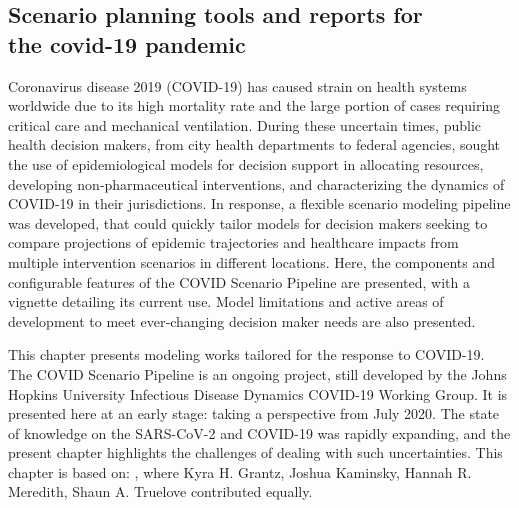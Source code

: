 \begin{fullwidth}
\chapter[Scenario planning tools and reports for the covid-19 pandemic]{Scenario planning tools and reports for \\the covid-19 pandemic}
\label{sec:covid-pipeline-reports}
Coronavirus disease 2019 (COVID-19) has caused strain on health systems worldwide due to its high mortality rate and the large portion of cases requiring critical care and mechanical ventilation. During these uncertain times, public health decision makers, from city health departments to federal agencies, sought the use of epidemiological models for decision support in allocating resources, developing non‑pharmaceutical interventions, and characterizing the dynamics of COVID‑19 in their jurisdictions. In response, a flexible scenario modeling pipeline was developed, that could quickly tailor models for decision makers seeking to compare projections of epidemic trajectories and healthcare impacts from multiple intervention scenarios in different locations. Here, the components and configurable features of the COVID Scenario Pipeline are presented, with a vignette detailing its current use. Model limitations and active areas of development to meet ever‑changing decision maker needs are also presented.
  
This chapter presents modeling works tailored for the response to COVID-19. The COVID Scenario Pipeline is an ongoing project, still developed by the Johns Hopkins University Infectious Disease Dynamics COVID-19 Working Group. It is presented here at an early stage: taking a perspective from July 2020. The state of knowledge on the SARS-CoV-2 and COVID-19 was rapidly expanding, and the present chapter highlights the challenges of dealing with such uncertainties. This chapter is based on:
, where Kyra H. Grantz, Joshua Kaminsky, Hannah R. Meredith, Shaun A. Truelove contributed equally.
  \end{fullwidth}


